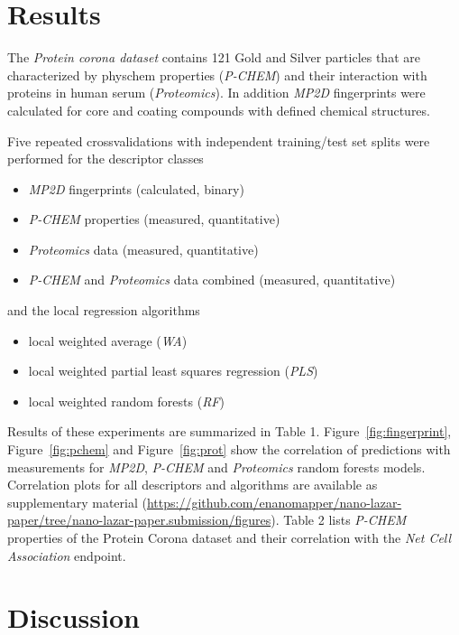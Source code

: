 \documentclass[utf8]{frontiersHLTH} %
\providecommand{\tightlist}{%
  \setlength{\itemsep}{0pt}\setlength{\parskip}{0pt}}
\begin{document}
\section{Results}\label{results}

The \emph{Protein corona dataset} contains 121 Gold and Silver particles
that are characterized by physchem properties (\emph{P-CHEM}) and their
interaction with proteins in human serum (\emph{Proteomics}). In
addition \emph{MP2D} fingerprints were calculated for core and coating
compounds with defined chemical structures.

Five repeated crossvalidations with independent training/test set splits
were performed for the descriptor classes

\begin{itemize}
\tightlist
\item
  \emph{MP2D} fingerprints (calculated, binary)
\item
  \emph{P-CHEM} properties (measured, quantitative)
\item
  \emph{Proteomics} data (measured, quantitative)
\item
  \emph{P-CHEM} and \emph{Proteomics} data combined (measured,
  quantitative)
\end{itemize}

and the local regression algorithms

\begin{itemize}
\tightlist
\item
  local weighted average (\emph{WA})
\item
  local weighted partial least squares regression (\emph{PLS})
\item
  local weighted random forests (\emph{RF})
\end{itemize}

Results of these experiments are summarized in Table 1.
Figure~\ref{fig:fingerprint}, Figure~\ref{fig:pchem} and
Figure~\ref{fig:prot} show the correlation of predictions with
measurements for \emph{MP2D}, \emph{P-CHEM} and \emph{Proteomics} random
forests models. Correlation plots for all descriptors and algorithms are
available as supplementary material
(\url{https://github.com/enanomapper/nano-lazar-paper/tree/nano-lazar-paper.submission/figures}).
Table 2 lists \emph{P-CHEM} properties of the Protein Corona dataset and
their correlation with the \emph{Net Cell Association} endpoint.

\section{Discussion}\label{discussion}
\end{document}
